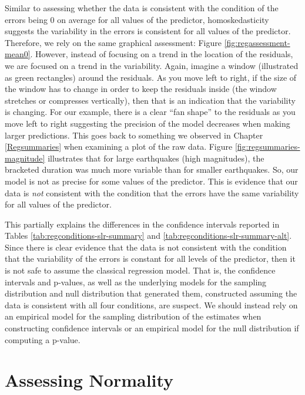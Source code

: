 \documentclass[
]{book}
\theoremstyle{plain}
\theoremstyle{mydefn}
\theoremstyle{myexmpl}
\theoremstyle{remark}
\begin{document}
Similar to assessing whether the data is consistent with the condition of the errors being 0 on average for all values of the predictor, homoskedasticity suggests the variability in the errors is consistent for all values of the predictor. Therefore, we rely on the same graphical assessment: Figure \ref{fig:regassessment-mean0}. However, instead of focusing on a trend in the location of the residuals, we are focused on a trend in the variability. Again, imagine a window (illustrated as green rectangles) around the residuals. As you move left to right, if the size of the window has to change in order to keep the residuals inside (the window stretches or compresses vertically), then that is an indication that the variability is changing. For our example, there is a clear ``fan shape'' to the residuals as you move left to right suggesting the precision of the model decreases when making larger predictions. This goes back to something we observed in Chapter \ref{Regsummaries} when examining a plot of the raw data. Figure \ref{fig:regsummaries-magnitude} illustrates that for large earthquakes (high magnitudes), the bracketed duration was much more variable than for smaller earthquakes. So, our model is not as precise for some values of the predictor. This is evidence that our data is \emph{not} consistent with the condition that the errors have the same variability for all values of the predictor.

This partially explains the differences in the confidence intervals reported in Tables \ref{tab:regconditions-slr-summary} and \ref{tab:regconditions-slr-summary-alt}. Since there is clear evidence that the data is not consistent with the condition that the variability of the errors is constant for all levels of the predictor, then it is not safe to assume the classical regression model. That is, the confidence intervals and p-values, as well as the underlying models for the sampling distribution and null distribution that generated them, constructed assuming the data is consistent with all four conditions, are suspect. We should instead rely on an empirical model for the sampling distribution of the estimates when constructing confidence intervals or an empirical model for the null distribution if computing a p-value.

\hypertarget{assessing-normality}{%
\section{Assessing Normality}\label{assessing-normality}}
\end{document}
